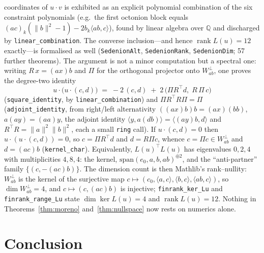 \documentclass[11pt,a4paper]{article}
\theoremstyle{definition}
\theoremstyle{remark}
\begin{document}
coordinates of $u \cdot v$ is exhibited as an explicit polynomial combination of the six constraint polynomials (e.g.\ the first octonion block equals $(ac)_k (\|b\|^2 - 1) - 2 b_k \langle ab, c \rangle$), found by linear algebra over $\mathbb{Q}$ and discharged by \texttt{linear\_combination}. The converse inclusion---and hence $\operatorname{rank} L(u) = 12$ exactly---is formalised as well (\texttt{SedenionAlt}, \texttt{SedenionRank}, \texttt{SedenionDim}; 57 further theorems). The argument is not a minor computation but a spectral one: writing $R\,x = (ax)b$ and $\Pi$ for the orthogonal projector onto $W_{ab}^\perp$, one proves the degree-two identity
\[
u \cdot \big(u \cdot (c, d)\big) \;=\; -2\,(c, d) \;+\; 2\,\big(\Pi R^{\top} d,\; R\,\Pi\, c\big)
\]
(\texttt{square\_identity}, by \texttt{linear\_combination}) and $\Pi R^{\top} R \Pi = \Pi$ (\texttt{adjoint\_identity}, from right/left alternativity $((ax)b)b = (ax)(bb)$, $a(ay) = (aa)y$, the adjoint identity $\langle y, a(db) \rangle = \langle (ay)b, d \rangle$ and $R^{\top}R = \|a\|^2 \|b\|^2$, each a small \texttt{ring} call). If $u \cdot (c, d) = 0$ then $u \cdot (u \cdot (c,d)) = 0$, so $c = \Pi R^{\top} d$ and $d = R \Pi c$, whence $c = \Pi c \in W_{ab}^\perp$ and $d = (ac)b$ (\texttt{kernel\_char}). Equivalently, $L(u)^{\top} L(u)$ has eigenvalues $0, 2, 4$ with multiplicities $4, 8, 4$: the kernel, $\mathrm{span}(e_0, a, b, ab)^{\oplus 2}$, and the ``anti-partner'' family $\{(c, -(ac)b)\}$. The dimension count is then Mathlib's rank--nullity: $W_{ab}^\perp$ is the kernel of the surjective map $c \mapsto (c_0, \langle a, c \rangle, \langle b, c \rangle, \langle ab, c \rangle)$, so $\dim W_{ab}^\perp = 4$, and $c \mapsto (c, (ac)b)$ is injective; \texttt{finrank\_ker\_Lu} and \texttt{finrank\_range\_Lu} state $\dim \ker L(u) = 4$ and $\operatorname{rank} L(u) = 12$. Nothing in Theorems~\ref{thm:moreno} and~\ref{thm:nullspace} now rests on numerics alone.

\section{Conclusion}
\label{sec:conclusion}
\end{document}
